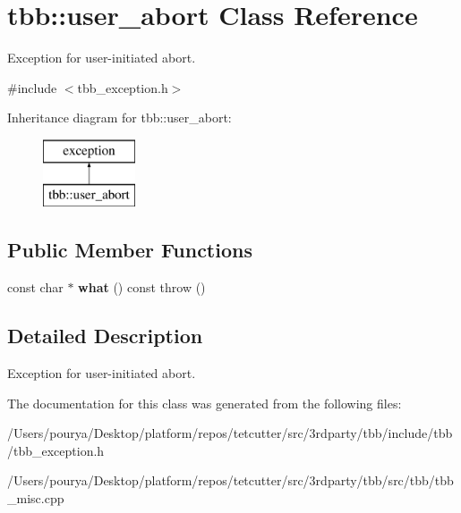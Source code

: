 \hypertarget{classtbb_1_1user__abort}{}\section{tbb\+:\+:user\+\_\+abort Class Reference}
\label{classtbb_1_1user__abort}


Exception for user-\/initiated abort.  




{\ttfamily \#include $<$tbb\+\_\+exception.\+h$>$}

Inheritance diagram for tbb\+:\+:user\+\_\+abort\+:\begin{figure}[H]
\begin{center}
\leavevmode
\includegraphics[height=2.000000cm]{classtbb_1_1user__abort}
\end{center}
\end{figure}
\subsection*{Public Member Functions}
\begin{DoxyCompactItemize}
\item 
\hypertarget{classtbb_1_1user__abort_ae46247f4f9b9d8b73485228391e450e3}{}const char $\ast$ {\bfseries what} () const   throw ()\label{classtbb_1_1user__abort_ae46247f4f9b9d8b73485228391e450e3}

\end{DoxyCompactItemize}


\subsection{Detailed Description}
Exception for user-\/initiated abort. 

The documentation for this class was generated from the following files\+:\begin{DoxyCompactItemize}
\item 
/\+Users/pourya/\+Desktop/platform/repos/tetcutter/src/3rdparty/tbb/include/tbb/tbb\+\_\+exception.\+h\item 
/\+Users/pourya/\+Desktop/platform/repos/tetcutter/src/3rdparty/tbb/src/tbb/tbb\+\_\+misc.\+cpp\end{DoxyCompactItemize}
